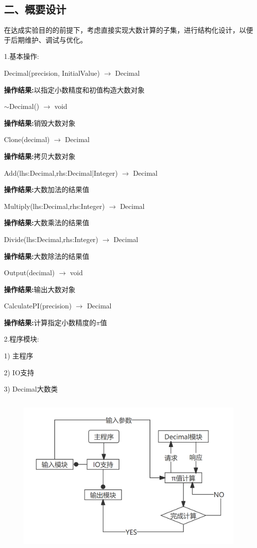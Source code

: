 \documentclass[UTF8, a4paper]{ctexart}
\begin{document}
\subsection*{二、概要设计}
在达成实验目的的前提下，考虑直接实现大数计算的子集，进行结构化设计，以便于后期维护、调试与优化。 \par
1.\;基本操作: \par
	Decimal(precision, InitialValue) $\rightarrow$ Decimal \par
	\qquad\textbf{操作结果:}\;以指定小数精度和初值构造大数对象 \par
	$\sim$Decimal() $\rightarrow$ void \par
	\qquad\textbf{操作结果:}\;销毁大数对象 \par
	Clone(decimal) $\rightarrow$ Decimal \par
	\qquad\textbf{操作结果:}\;拷贝大数对象 \par
	Add(lhs:Decimal,rhs:Decimal|Integer) $\rightarrow$ Decimal \par
	\qquad\textbf{操作结果:}\;大数加法的结果值 \par
	Multiply(lhs:Decimal,rhs:Integer) $\rightarrow$ Decimal \par
	\qquad\textbf{操作结果:}\;大数乘法的结果值 \par
	Divide(lhs:Decimal,rhs:Integer) $\rightarrow$ Decimal \par
	\qquad\textbf{操作结果:}\;大数除法的结果值 \par
	Output(decimal) $\rightarrow$ void \par
	\qquad\textbf{操作结果:}\;输出大数对象 \par
	CalculatePI(precision) $\rightarrow$ Decimal \par
	\qquad\textbf{操作结果:}\;计算指定小数精度的$\pi$值 \par
2.\;程序模块: \par
1) 主程序 \par
2) IO支持 \par
3) Decimal大数类 \par
\begin{figure}[H]
	\begin{minipage}[t]{\linewidth}
		\centering
		\includegraphics[width=125mm,height=80mm]{./assets/DS02-1}
	\end{minipage}
\end{figure}
\end{document}
